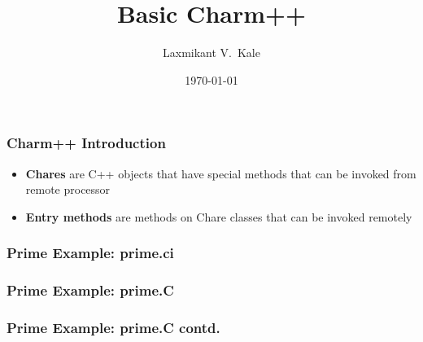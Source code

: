 \documentclass{beamer}
\title{Basic Charm++}
\author[Laxmikant V.~Kale]{
Laxmikant V.~Kale
}
\date{\today}
\begin{document}
\begin{frame}[fragile]
  \frametitle{Charm++ Introduction}
    \begin{itemize}
    \item \textbf{Chares} are C++ objects that have special methods that can be invoked
    from remote processor
    \item \textbf{Entry methods} are methods on Chare classes that can be invoked
    remotely
    \end{itemize}
\end{frame}



\begin{frame}[fragile]
  \frametitle{Prime Example: prime.ci}
  
\end{frame}

\begin{frame}[fragile]
  \frametitle{Prime Example: prime.C}
  
\end{frame}

\begin{frame}[fragile]
  \frametitle{Prime Example: prime.C contd.}
  
\end{frame}


\end{document}
